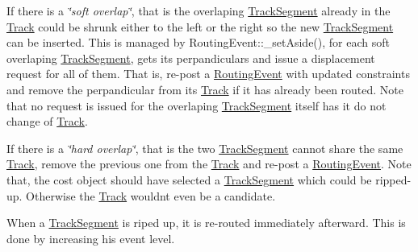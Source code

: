 \begin{DoxyEnumerate}
\begin{DoxyItemize}
If there is a {\itshape \char`\"{}soft overlap\char`\"{}}, that is the overlaping {\ttfamily \mbox{\hyperlink{classKite_1_1TrackSegment}{Track\+Segment}}} already in the {\ttfamily \mbox{\hyperlink{classKite_1_1Track}{Track}}} could be shrunk either to the left or the right so the new {\ttfamily \mbox{\hyperlink{classKite_1_1TrackSegment}{Track\+Segment}}} can be inserted. This is managed by {\ttfamily Routing\+Event\+::\+\_\+set\+Aside()}, for each soft overlaping {\ttfamily \mbox{\hyperlink{classKite_1_1TrackSegment}{Track\+Segment}}}, gets its perpandiculars and issue a displacement request for all of them. That is, re-\/post a {\ttfamily \mbox{\hyperlink{classKite_1_1RoutingEvent}{Routing\+Event}}} with updated constraints and remove the perpandicular from it\textquotesingle{}s \mbox{\hyperlink{classKite_1_1Track}{Track}} if it has already been routed. Note that no request is issued for the overlaping {\ttfamily \mbox{\hyperlink{classKite_1_1TrackSegment}{Track\+Segment}}} itself has it do not change of \mbox{\hyperlink{classKite_1_1Track}{Track}}.

If there is a {\itshape \char`\"{}hard overlap\char`\"{}}, that is the two {\ttfamily \mbox{\hyperlink{classKite_1_1TrackSegment}{Track\+Segment}}} cannot share the same {\ttfamily \mbox{\hyperlink{classKite_1_1Track}{Track}}}, remove the previous one from the {\ttfamily \mbox{\hyperlink{classKite_1_1Track}{Track}}} and re-\/post a {\ttfamily \mbox{\hyperlink{classKite_1_1RoutingEvent}{Routing\+Event}}}. Note that, the cost object should have selected a {\ttfamily \mbox{\hyperlink{classKite_1_1TrackSegment}{Track\+Segment}}} which could be ripped-\/up. Otherwise the {\ttfamily \mbox{\hyperlink{classKite_1_1Track}{Track}}} would\textquotesingle{}nt even be a candidate. 
\end{DoxyItemize}

When a \mbox{\hyperlink{classKite_1_1TrackSegment}{Track\+Segment}} is riped up, it is re-\/routed immediately afterward. This is done by increasing his event level. 
\end{DoxyEnumerate}